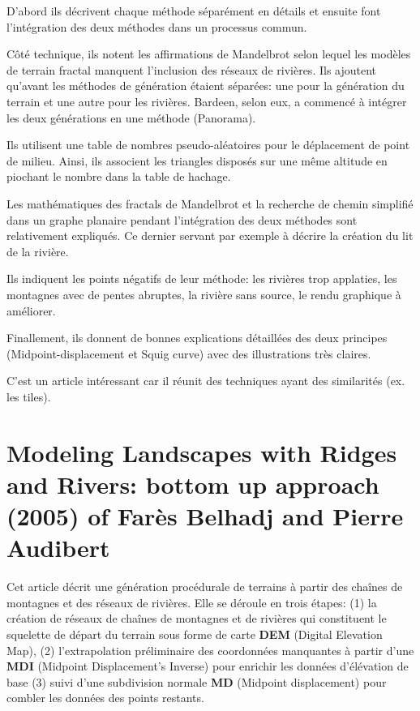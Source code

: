 \documentclass[11pt]{article}
\begin{document}
D'abord ils décrivent chaque méthode séparément en détails et ensuite font l'intégration des deux méthodes dans un processus commun.

Côté technique, ils notent les affirmations de Mandelbrot selon lequel les modèles de terrain fractal manquent l'inclusion des réseaux de rivières.
Ils ajoutent qu'avant les méthodes de génération étaient séparées: une pour la génération du terrain et une autre pour les rivières. Bardeen, selon eux, a commencé à intégrer les deux générations en une méthode (Panorama).

Ils utilisent une table de nombres pseudo-aléatoires pour le déplacement de point de milieu. Ainsi, ils associent les triangles disposés sur une même altitude en piochant le nombre dans la table de hachage.

Les mathématiques des fractals de Mandelbrot et la recherche de chemin simplifié dans un graphe planaire pendant l'intégration des deux méthodes sont relativement expliqués. Ce dernier servant par exemple à décrire la création du lit de la rivière.

Ils indiquent les points négatifs de leur méthode: les rivières trop applaties, les montagnes avec de pentes abruptes, la rivière sans source, le rendu graphique à améliorer.

Finallement, ils donnent de bonnes explications détaillées des deux principes (Midpoint-displacement et Squig curve) avec des illustrations très claires.

C'est un article intéressant car il réunit des techniques ayant des similarités (ex. les tiles).

\section{Modeling Landscapes with Ridges and Rivers: bottom up approach (2005) of Farès Belhadj and Pierre Audibert}

Cet article décrit une génération procédurale de terrains à partir des chaînes de montagnes et des réseaux de rivières. Elle se déroule en trois étapes: (1) la création de réseaux de chaînes de montagnes et de rivières qui constituent le squelette de départ du terrain sous forme de carte \textbf{DEM} (Digital Elevation Map), (2) l'extrapolation préliminaire des coordonnées manquantes à partir d'une \textbf{MDI} (Midpoint Displacement's Inverse) pour enrichir les données d'élévation de base (3) suivi d'une subdivision normale \textbf{MD} (Midpoint displacement) pour combler les données des points restants.
\end{document}
